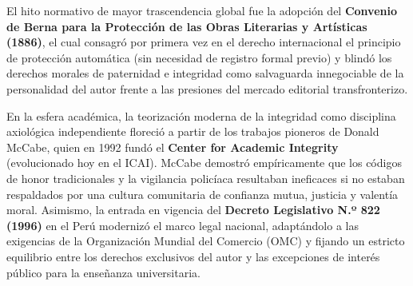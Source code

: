 El hito normativo de mayor trascendencia global fue la adopción del \textbf{Convenio de Berna para la Protección de las Obras Literarias y Artísticas (1886)}, el cual consagró por primera vez en el derecho internacional el principio de protección automática (sin necesidad de registro formal previo) y blindó los derechos morales de paternidad e integridad como salvaguarda innegociable de la personalidad del autor frente a las presiones del mercado editorial transfronterizo.

En la esfera académica, la teorización moderna de la integridad como disciplina axiológica independiente floreció a partir de los trabajos pioneros de Donald McCabe, quien en 1992 fundó el \textbf{Center for Academic Integrity} (evolucionado hoy en el ICAI). McCabe demostró empíricamente que los códigos de honor tradicionales y la vigilancia policíaca resultaban ineficaces si no estaban respaldados por una cultura comunitaria de confianza mutua, justicia y valentía moral. Asimismo, la entrada en vigencia del \textbf{Decreto Legislativo N.º 822 (1996)} en el Perú modernizó el marco legal nacional, adaptándolo a las exigencias de la Organización Mundial del Comercio (OMC) y fijando un estricto equilibrio entre los derechos exclusivos del autor y las excepciones de interés público para la enseñanza universitaria.\\[0.4cm]

